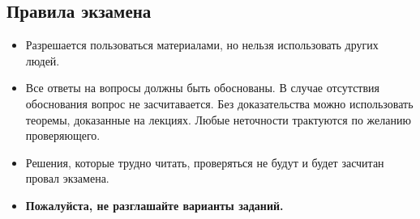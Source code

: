 \documentclass[a4paper, 12pt]{article}
\begin{document}

\renewcommand{\coursetitle}{\textsc{Ex}}


\subsection*{Правила экзамена}

\begin{itemize}
    \item Разрешается пользоваться материалами, но нельзя использовать других людей.
    \item Все ответы на вопросы должны быть обоснованы. В случае отсутствия обоснования вопрос не
        засчитавается. Без доказательства можно использовать теоремы, доказанные на лекциях. Любые
        неточности трактуются по желанию проверяющего.
    \item Решения, которые трудно читать, проверяться не будут и будет засчитан провал экзамена.
    \item \textbf{Пожалуйста, не разглашайте варианты заданий.}
\end{itemize}

\vspace{0.5cm}
\end{document}
